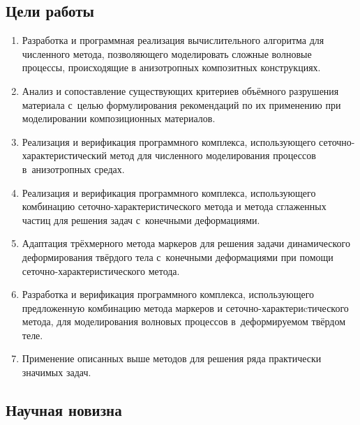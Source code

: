 \documentclass[thesis.tex]{subfiles}
\begin{document}
\subsection*{Цели работы}

\begin{enumerate}
    \item Разработка и программная реализация вычислительного алгоритма для численного метода, позволяющего
          моделировать сложные волновые процессы, происходящие в анизотропных композитных конструкциях.
    \item Анализ и сопоставление существующих критериев объёмного разрушения материала с~целью формулирования рекомендаций по их
          применению при моделировании композиционных материалов.
    \item Реализация и верификация программного комплекса, использующего сеточно-характеристический метод для
          численного моделирования процессов в~анизотропных средах.
    \item Реализация и верификация программного комплекса, использующего комбинацию сеточно-характеристического
          метода и метода сглаженных частиц для решения задач с~конечными деформациями.
    \item Адаптация трёхмерного метода маркеров для решения задачи динамического деформирования твёрдого
          тела с~конечными деформациями при помощи сеточно-характеристического метода.
    \item Разработка и верификация программного комплекса, использующего предложенную комбинацию метода маркеров
          и сеточно-ха\-рак\-те\-риc\-ти\-чес\-ко\-го метода, для моделирования волновых процессов в~деформируемом
          твёрдом теле.
    \item Применение описанных выше методов для решения ряда практически значимых задач.
\end{enumerate}

\subsection*{Научная новизна}
\end{document}

